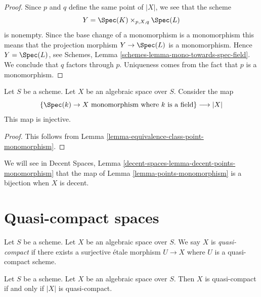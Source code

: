 \begin{proof}
Since $p$ and $q$ define the same point of $|X|$, we see that the scheme
$$
Y = \Spec(K) \times_{p, X, q} \Spec(L)
$$
is nonempty. Since the base change of a monomorphism is a monomorphism
this means that the projection morphism $Y \to \Spec(L)$
is a monomorphism. Hence $Y = \Spec(L)$, see
Schemes, Lemma \ref{schemes-lemma-mono-towards-spec-field}.
We conclude that $q$ factors through $p$. Uniqueness
comes from the fact that $p$ is a monomorphism.
\end{proof}

\begin{lemma}
\label{lemma-points-monomorphism}
Let $S$ be a scheme. Let $X$ be an algebraic space over $S$.
Consider the map
$$
\{\Spec(k) \to X \text{ monomorphism where }k\text{ is a field}\}
\longrightarrow
|X|
$$
This map is injective.
\end{lemma}

\begin{proof}
This follows from Lemma \ref{lemma-equivalence-class-point-monomorphism}.
\end{proof}

\noindent
We will see in Decent Spaces,
Lemma \ref{decent-spaces-lemma-decent-points-monomorphism}
that the map of Lemma \ref{lemma-points-monomorphism}
is a bijection when $X$ is decent.

















\section{Quasi-compact spaces}
\label{section-quasi-compact}

\begin{definition}
\label{definition-quasi-compact}
Let $S$ be a scheme.
Let $X$ be an algebraic space over $S$.
We say $X$ is {\it quasi-compact} if there exists a surjective
\'etale morphism $U \to X$ where $U$ is a quasi-compact scheme.
\end{definition}

\begin{lemma}
\label{lemma-quasi-compact-space}
Let $S$ be a scheme.
Let $X$ be an algebraic space over $S$.
Then $X$ is quasi-compact if and only if $|X|$ is quasi-compact.
\end{lemma}

